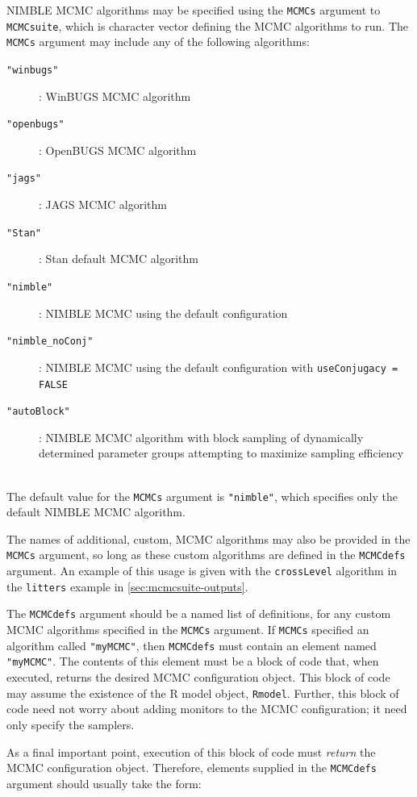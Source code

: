 \documentclass[12pt,oneside]{book}\usepackage[]{graphicx}\usepackage[]{color}
\def\cd#1{\texttt{#1}}
\begin{document}
NIMBLE MCMC algorithms may be specified using the \cd{MCMCs} argument to \cd{MCMCsuite}, which is character vector defining the MCMC algorithms to run.  The \cd{MCMCs} argument may include any of the following algorithms: \\

\begin{description}
\item[\cd{"winbugs"}]: WinBUGS MCMC algorithm 
\item[\cd{"openbugs"}]: OpenBUGS MCMC algorithm 
\item[\cd{"jags"}]: JAGS MCMC algorithm 
\item[\cd{"Stan"}]: Stan default MCMC algorithm 
\item[\cd{"nimble"}]: NIMBLE MCMC using the default configuration 
\item[\cd{"nimble\_noConj"}]: NIMBLE MCMC using the default configuration with \cd{useConjugacy = FALSE} 
\item[\cd{"autoBlock"}]: NIMBLE MCMC algorithm with block sampling of dynamically determined parameter groups attempting to maximize sampling efficiency 
\end{description}
\ \\  %

The default value for the \cd{MCMCs} argument is \cd{"nimble"}, which specifies only the default NIMBLE MCMC algorithm.  
 
The names of additional, custom, MCMC algorithms may also be provided in the \cd{MCMCs} argument, so long as these custom algorithms are defined in the \cd{MCMCdefs} argument.  An example of this usage is given with the \cd{crossLevel} algorithm in the \cd{litters} example in \ref{sec:mcmcsuite-outputs}.

The \cd{MCMCdefs} argument should be a named list of definitions, for any custom MCMC algorithms specified in the \cd{MCMCs} argument.  If \cd{MCMCs} specified an algorithm called \cd{"myMCMC"}, then \cd{MCMCdefs} must contain an element named \cd{"myMCMC"}.  The contents of this element must be a block of code that, when executed, returns the desired MCMC configuration object.  This block of code may assume the existence of the R model object, \cd{Rmodel}.  Further, this block of code need not worry about adding monitors to the MCMC configuration; it need only specify the samplers.  
 
As a final important point, execution of this block of code must \emph{return} the MCMC configuration object.  Therefore, elements supplied in the \cd{MCMCdefs} argument should usually take the form:
\end{document}
